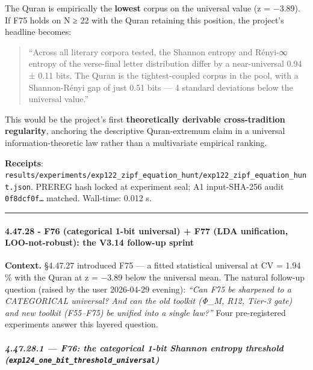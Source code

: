 \documentclass[
]{article}
\begin{document}
The Quran is empirically the \textbf{lowest} corpus on the universal
value (z = −3.89). If F75 holds on N ≥ 22 with the Quran retaining this
position, the project's headline becomes:

\begin{quote}
``Across all literary corpora tested, the Shannon entropy and Rényi-∞
entropy of the verse-final letter distribution differ by a
near-universal 0.94 ± 0.11 bits. The Quran is the tightest-coupled
corpus in the pool, with a Shannon-Rényi gap of just 0.51 bits --- 4
standard deviations below the universal value.''
\end{quote}

This would be the project's first \textbf{theoretically derivable
cross-tradition regularity}, anchoring the descriptive Quran-extremum
claim in a universal information-theoretic law rather than a
multivariate empirical ranking.

\textbf{Receipts}:
\texttt{results/experiments/exp122\_zipf\_equation\_hunt/exp122\_zipf\_equation\_hunt.json}.
PREREG hash locked at experiment seal; A1 input-SHA-256 audit
\texttt{0f8dcf0f…} matched. Wall-time: 0.012 s.

\begin{center}\rule{0.5\linewidth}{0.5pt}\end{center}

\paragraph{4.47.28 - F76 (categorical 1-bit universal) + F77 (LDA
unification, LOO-not-robust): the V3.14 follow-up
sprint}\label{f76-categorical-1-bit-universal-f77-lda-unification-loo-not-robust-the-v3.14-follow-up-sprint}

\textbf{Context.} §4.47.27 introduced F75 --- a fitted statistical
universal at CV = 1.94 \% with the Quran at z = −3.89 below the
universal mean. The natural follow-up question (raised by the user
2026-04-29 evening): \emph{``Can F75 be sharpened to a CATEGORICAL
universal? And can the old toolkit (Φ\_M, R12, Tier-3 gate) and new
toolkit (F55--F75) be unified into a single law?''} Four pre-registered
experiments answer this layered question.

\subparagraph{\texorpdfstring{4.47.28.1 --- F76: the categorical 1-bit
Shannon entropy threshold
(\texttt{exp124\_one\_bit\_threshold\_universal})}{4.47.28.1 --- F76: the categorical 1-bit Shannon entropy threshold (exp124\_one\_bit\_threshold\_universal)}}\label{f76-the-categorical-1-bit-shannon-entropy-threshold-exp124_one_bit_threshold_universal}
\end{document}
